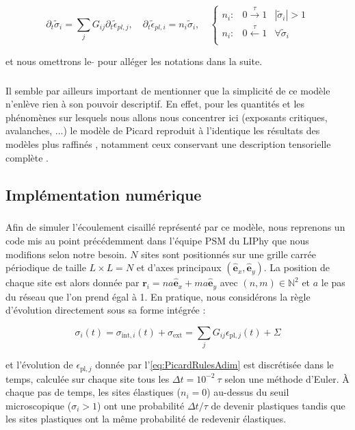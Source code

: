 \begin{equation}
	\partial_t\tilde{\sigma}_i = \sum_{j}G_{ij}\partial_t \tilde{\epsilon}_{pl,j},\quad \partial_t \tilde{\epsilon}_{pl,i} = n_i \tilde{\sigma}_i,\quad
	\left\{
    \begin{array}{lcc}
    n_i: & 0\xrightarrow{\tau}1 & |\tilde{\sigma}_i|>1 \\
    n_i: & 0\xleftarrow{\tau}1 & \forall \tilde{\sigma}_i\\
    \end{array}
    \right.
\label{eq:PicardRulesAdim}
\end{equation}

\noindent et nous omettrons le $\tilde{}$ pour alléger les notations dans la suite.

\subparagraph{}Il semble par ailleurs important de mentionner que la simplicité de ce modèle n'enlève rien à son pouvoir descriptif. En effet, pour les quantités et les phénomènes sur lesquels nous allons nous concentrer ici (exposants critiques, avalanches, ...) le modèle de Picard reproduit à l'identique les résultats des modèles plus raffinés \cite{ferrero_criticality_2019}, notamment ceux conservant une description tensorielle complète \cite{nicolas_deformation_2018, budrikis_universal_2017}.

\subsection{Implémentation numérique}

\subparagraph{}Afin de simuler l'écoulement cisaillé représenté par ce modèle, nous reprenons un code mis au point précédemment dans l'équipe PSM du LIPhy que nous modifions selon notre besoin. $N$ sites sont positionnés sur une grille carrée périodique de taille $L\times L = N$ et d'axes principaux $(\hat{\mathbf{e}}_x, \hat{\mathbf{e}}_y)$. La position de chaque site est alors donnée par $\mathbf{r}_i = na\hat{\mathbf{e}}_x + ma \hat{\mathbf{e}}_y$ avec $(n,m) \in \mathbb{N}^2$ et $a$ le pas du réseau que l'on prend égal à 1. En pratique, nous considérons la règle d'évolution directement sous sa forme intégrée :

\begin{equation}
	\sigma_i(t) = \sigma_{\text{int},i}(t)+\sigma_\text{ext} =  \sum_{j}G_{ij}\epsilon_{\text{pl},j}(t)+\Sigma
	\label{eq:DynPicardInteg}
\end{equation}

\noindent et l'évolution de $\epsilon_{\text{pl},j}$ donnée par l'\autoref{eq:PicardRulesAdim} est discrétisée dans le temps, calculée sur chaque site tous les $\Delta t = 10^{-2}~\tau$ selon une méthode d'Euler. \`A chaque pas de temps, les sites élastiques ($n_i=0$) au-dessus du seuil microscopique ($\sigma_i >1$) ont une probabilité $\Delta t / \tau$ de devenir plastiques tandis que les sites plastiques ont la même probabilité de redevenir élastiques.

